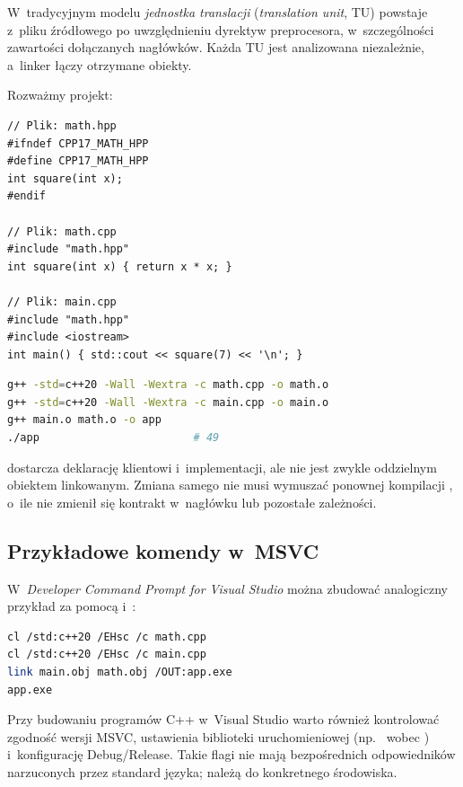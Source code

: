 W~tradycyjnym modelu \emph{jednostka translacji} (\emph{translation unit},
TU) powstaje z~pliku źródłowego po uwzględnieniu dyrektyw preprocesora,
w~szczególności zawartości dołączanych nagłówków. Każda TU jest
analizowana niezależnie, a~linker łączy otrzymane obiekty.

Rozważmy projekt:
\begin{lstlisting}[caption={Trzy pliki klasycznego projektu C++: API, implementacja i klient.}]
// Plik: math.hpp
#ifndef CPP17_MATH_HPP
#define CPP17_MATH_HPP
int square(int x);
#endif

// Plik: math.cpp
#include "math.hpp"
int square(int x) { return x * x; }

// Plik: main.cpp
#include "math.hpp"
#include <iostream>
int main() { std::cout << square(7) << '\n'; }
\end{lstlisting}

\begin{lstlisting}[language=bash,caption={Niezalezne budowanie TU i koncowe linkowanie.}]
g++ -std=c++20 -Wall -Wextra -c math.cpp -o math.o
g++ -std=c++20 -Wall -Wextra -c main.cpp -o main.o
g++ main.o math.o -o app
./app                        # 49
\end{lstlisting}

 dostarcza deklarację klientowi i~implementacji,
ale nie jest zwykle oddzielnym obiektem linkowanym. Zmiana samego
 nie musi wymuszać ponownej kompilacji ,
o~ile nie zmienił się kontrakt w~nagłówku lub pozostałe zależności.

\subsection{Przykładowe komendy w~MSVC}

W~\emph{Developer Command Prompt for Visual Studio} można zbudować
analogiczny przykład za pomocą  i~:

\begin{lstlisting}[language=bash,caption={Kompilacja dwóch plików w środowisku MSVC/Windows.}]
cl /std:c++20 /EHsc /c math.cpp
cl /std:c++20 /EHsc /c main.cpp
link main.obj math.obj /OUT:app.exe
app.exe
\end{lstlisting}

Przy budowaniu programów C++ w~Visual Studio warto również
kontrolować zgodność wersji MSVC, ustawienia biblioteki uruchomieniowej
(np.~ wobec ) i~konfigurację Debug/Release.
Takie flagi nie mają bezpośrednich odpowiedników narzuconych przez
standard języka; należą do konkretnego środowiska.


